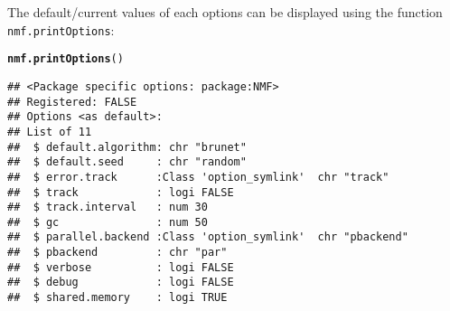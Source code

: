 \documentclass[a4paper]{article}\usepackage{graphicx, color}
\makeatletter
\newcommand{\hlfunctioncall}[1]{\textcolor[rgb]{0.501960784313725,0,0.329411764705882}{\textbf{#1}}}%
\newenvironment{kframe}{%
 \def\at@end@of@kframe{}%
 \ifinner\ifhmode%
  \def\at@end@of@kframe{\end{minipage}}%
  \begin{minipage}{\columnwidth}%
 \fi\fi%
 \def\FrameCommand##1{\hskip\@totalleftmargin \hskip-\fboxsep
 \colorbox{shadecolor}{##1}\hskip-\fboxsep
     \hskip-\linewidth \hskip-\@totalleftmargin \hskip\columnwidth}%
 \MakeFramed {\advance\hsize-\width
   \@totalleftmargin\z@ \linewidth\hsize
   \@setminipage}}%
 {\par\unskip\endMakeFramed%
 \at@end@of@kframe}
\newenvironment{knitrout}{}{} %
\let\code=\texttt
\makeatother
\begin{document}
The default/current values of each options can be displayed using the function
\code{nmf.printOptions}:

\begin{knitrout}
\color{fgcolor}\begin{kframe}
\begin{alltt}
\hlfunctioncall{nmf.printOptions}()
\end{alltt}
\begin{verbatim}
## <Package specific options: package:NMF>
## Registered: FALSE
## Options <as default>:
## List of 11
##  $ default.algorithm: chr "brunet"
##  $ default.seed     : chr "random"
##  $ error.track      :Class 'option_symlink'  chr "track"
##  $ track            : logi FALSE
##  $ track.interval   : num 30
##  $ gc               : num 50
##  $ parallel.backend :Class 'option_symlink'  chr "pbackend"
##  $ pbackend         : chr "par"
##  $ verbose          : logi FALSE
##  $ debug            : logi FALSE
##  $ shared.memory    : logi TRUE
\end{verbatim}
\end{kframe}
\end{knitrout}
\end{document}
